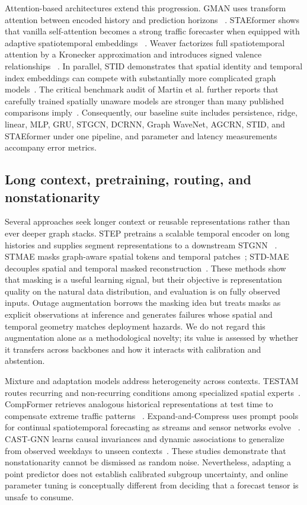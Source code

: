 \documentclass[preprint,12pt]{elsarticle}
\begin{document}
Attention-based architectures extend this progression. GMAN uses transform
attention between encoded history and prediction horizons
~\cite{zheng2020gman}. STAEformer shows that vanilla self-attention becomes a
strong traffic forecaster when equipped with adaptive spatiotemporal embeddings
~\cite{liu2023staeformer}. Weaver factorizes full spatiotemporal attention by a
Kronecker approximation and introduces signed valence relationships
~\cite{cheong2026weaver}. In parallel, STID demonstrates that spatial identity
and temporal index embeddings can compete with substantially more complicated
graph models~\cite{shao2022stid}. The critical benchmark audit of Martin et al.
further reports that carefully trained spatially unaware models are stronger
than many published comparisons imply~\cite{martin2026audit}. Consequently, our
baseline suite includes persistence, ridge, linear, MLP, GRU, STGCN, DCRNN,
Graph WaveNet, AGCRN, STID, and STAEformer under one pipeline, and parameter and
latency measurements accompany error metrics.

\subsection{Long context, pretraining, routing, and nonstationarity}
Several approaches seek longer context or reusable representations rather than
ever deeper graph stacks. STEP pretrains a scalable temporal encoder on long
histories and supplies segment representations to a downstream STGNN
~\cite{shao2022step}. STMAE masks graph-aware spatial tokens and temporal
patches~\cite{sun2023stmae}; STD-MAE decouples spatial and temporal masked
reconstruction~\cite{gao2024stdmae}. These methods show that masking is a useful
learning signal, but their objective is representation quality on the natural
data distribution, and evaluation is on fully observed inputs. Outage
augmentation borrows the masking idea but treats masks as explicit
observations at inference and generates failures whose spatial and temporal
geometry matches deployment hazards. We do not regard this augmentation alone as
a methodological novelty; its value is assessed by whether it transfers across
backbones and how it interacts with calibration and abstention.

Mixture and adaptation models address heterogeneity across contexts. TESTAM
routes recurring and non-recurring conditions among specialized spatial
experts~\cite{lee2024testam}. CompFormer retrieves analogous historical
representations at test time to compensate extreme traffic patterns
~\cite{zhang2023compformer}. Expand-and-Compress uses prompt pools for continual
spatiotemporal forecasting as streams and sensor networks evolve
~\cite{chen2025eac}. CAST-GNN learns causal invariances and dynamic associations
to generalize from observed weekdays to unseen contexts~\cite{wu2026cast}.
These studies demonstrate that nonstationarity cannot be dismissed as random
noise. Nevertheless, adapting a point predictor does not establish calibrated
subgroup uncertainty, and online parameter tuning is conceptually different
from deciding that a forecast tensor is unsafe to consume.
\end{document}
